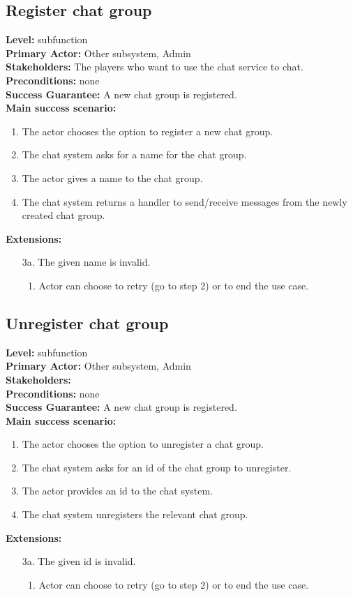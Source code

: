 \documentclass[a4paper,11pt]{report}
\begin{document}
\subsection{Register chat group}
\textbf{Level:} subfunction \\
\textbf{Primary Actor:} Other subsystem, Admin \\
\textbf{Stakeholders:} The players who want to use the chat service to chat. \\
\textbf{Preconditions:} none \\
\textbf{Success Guarantee:} A new chat group is registered. \\
\textbf{Main success scenario:} 
\begin{enumerate}
\item The actor chooses the option to register a new chat group. 
\item The chat system asks for a name for the chat group. 
\item The actor gives a name to the chat group. 
\item The chat system returns a handler to send/receive messages from the newly created chat group. 
\end{enumerate}
\textbf{Extensions:}
\begin{itemize}
\item[3a.] The given name is invalid.
\begin{enumerate}
\item Actor can choose to retry (go to step 2) or to end the use case. 
\end{enumerate}
\end{itemize}

\subsection{Unregister chat group}
\textbf{Level:} subfunction \\
\textbf{Primary Actor:} Other subsystem, Admin \\
\textbf{Stakeholders:}  \\
\textbf{Preconditions:} none \\
\textbf{Success Guarantee:} A new chat group is registered. \\
\textbf{Main success scenario:} 
\begin{enumerate}
\item The actor chooses the option to unregister a chat group. 
\item The chat system asks for an id of the chat group to unregister.
\item The actor provides an id to the chat system. 
\item The chat system unregisters the relevant chat group. 
\end{enumerate}
\textbf{Extensions:}
\begin{itemize}
\item[3a.] The given id is invalid.
\begin{enumerate}
\item Actor can choose to retry (go to step 2) or to end the use case. 
\end{enumerate}
\end{itemize}
\end{document}
